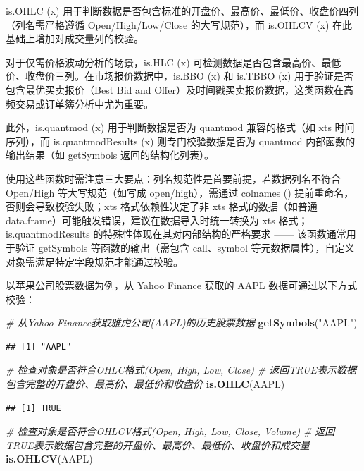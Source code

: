 \documentclass[]{ctexbook}
\newenvironment{Shaded}{\begin{snugshade}}{\end{snugshade}}
\newcommand{\CommentTok}[1]{\textcolor[rgb]{0.56,0.35,0.01}{\textit{#1}}}
\newcommand{\FunctionTok}[1]{\textcolor[rgb]{0.13,0.29,0.53}{\textbf{#1}}}
\newcommand{\NormalTok}[1]{#1}
\newcommand{\StringTok}[1]{\textcolor[rgb]{0.31,0.60,0.02}{#1}}
\begin{document}
is.OHLC (x) 用于判断数据是否包含标准的开盘价、最高价、最低价、收盘价四列（列名需严格遵循 Open/High/Low/Close 的大写规范），而 is.OHLCV (x) 在此基础上增加对成交量列的校验。

对于仅需价格波动分析的场景，is.HLC (x) 可检测数据是否包含最高价、最低价、收盘价三列。在市场报价数据中，is.BBO (x) 和 is.TBBO (x) 用于验证是否包含最优买卖报价（Best Bid and Offer）及时间戳买卖报价数据，这类函数在高频交易或订单簿分析中尤为重要。

此外，is.quantmod (x) 用于判断数据是否为 quantmod 兼容的格式（如 xts 时间序列），而 is.quantmodResults (x) 则专门校验数据是否为 quantmod 内部函数的输出结果（如 getSymbols 返回的结构化列表）。

使用这些函数时需注意三大要点：列名规范性是首要前提，若数据列名不符合 Open/High 等大写规范（如写成 open/high），需通过 colnames () 提前重命名，否则会导致校验失败；xts 格式依赖性决定了非 xts 格式的数据（如普通 data.frame）可能触发错误，建议在数据导入时统一转换为 xts 格式；is.quantmodResults 的特殊性体现在其对内部结构的严格要求 ------ 该函数通常用于验证 getSymbols 等函数的输出（需包含 call、symbol 等元数据属性），自定义对象需满足特定字段规范才能通过校验。

以苹果公司股票数据为例，从 Yahoo Finance 获取的 AAPL 数据可通过以下方式校验：

\begin{Shaded}
\begin{Highlighting}[]
\CommentTok{\# 从Yahoo Finance获取雅虎公司(AAPL)的历史股票数据}
\FunctionTok{getSymbols}\NormalTok{(}\StringTok{"AAPL"}\NormalTok{)}
\end{Highlighting}
\end{Shaded}

\begin{verbatim}
## [1] "AAPL"
\end{verbatim}

\begin{Shaded}
\begin{Highlighting}[]
\CommentTok{\# 检查对象是否符合OHLC格式(Open, High, Low, Close)}
\CommentTok{\# 返回TRUE表示数据包含完整的开盘价、最高价、最低价和收盘价}
\FunctionTok{is.OHLC}\NormalTok{(AAPL)}
\end{Highlighting}
\end{Shaded}

\begin{verbatim}
## [1] TRUE
\end{verbatim}

\begin{Shaded}
\begin{Highlighting}[]
\CommentTok{\# 检查对象是否符合OHLCV格式(Open, High, Low, Close, Volume)}
\CommentTok{\# 返回TRUE表示数据包含完整的开盘价、最高价、最低价、收盘价和成交量}
\FunctionTok{is.OHLCV}\NormalTok{(AAPL)}
\end{Highlighting}
\end{Shaded}
\end{document}
